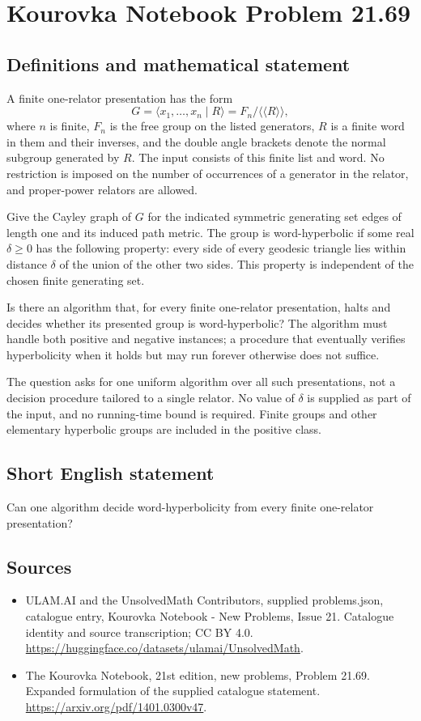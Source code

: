 \documentclass[11pt,a4paper]{article}
\begin{document}
\section*{Kourovka Notebook Problem 21.69}\label{statement}

\subsection{Definitions and mathematical statement}
A finite one-relator presentation has the form
\[
 G=\langle x_1,\ldots,x_n\mid R\rangle
   =F_n/\langle\!\langle R\rangle\!\rangle,
\]
where $n$ is finite, $F_n$ is the free group on the listed generators,
$R$ is a finite word in them and their inverses, and the double angle
brackets denote the normal subgroup generated by $R$.
The input consists of this finite list and word. No restriction is
imposed on the number of occurrences of a generator in the relator,
and proper-power relators are allowed.

Give the Cayley graph of $G$ for the indicated symmetric generating
set edges of length one and its induced path metric. The group is
word-hyperbolic if some real $\delta\ge0$ has the following property:
every side of every geodesic triangle lies within distance $\delta$
of the union of the other two sides. This property is independent
of the chosen finite generating set.

Is there an algorithm that, for every finite one-relator presentation,
halts and decides whether its presented group is word-hyperbolic?
The algorithm must handle both positive and negative instances; a
procedure that eventually verifies hyperbolicity when it holds but
may run forever otherwise does not suffice.

The question asks for one uniform algorithm over all such presentations,
not a decision procedure tailored to a single relator. No value of
$\delta$ is supplied as part of the input, and no running-time bound
is required. Finite groups and other elementary hyperbolic groups are
included in the positive class.
\subsection{Short English statement}
Can one algorithm decide word-hyperbolicity from every finite one-relator presentation?
\subsection{Sources}
\begin{itemize}
\item[S1] ULAM.AI and the UnsolvedMath Contributors, supplied problems.json, catalogue entry, Kourovka Notebook - New Problems, Issue 21. Catalogue identity and source transcription; CC BY 4.0.
\url{https://huggingface.co/datasets/ulamai/UnsolvedMath}.
\item[S2] The Kourovka Notebook, 21st edition, new problems, Problem 21.69. Expanded formulation of the supplied catalogue statement.
\url{https://arxiv.org/pdf/1401.0300v47}.
\end{itemize}
\end{document}
